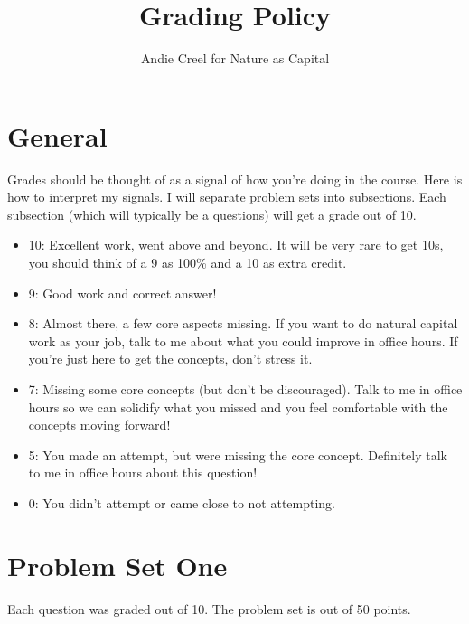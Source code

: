 \documentclass{article}
\title{Grading Policy}
\author{Andie Creel for Nature as Capital}
\begin{document}
\maketitle

\section{General}
Grades should be thought of as a signal of how you're doing in the course. Here is how to interpret my signals. I will separate problem sets into subsections. Each subsection (which will typically be a questions) will get a grade out of 10. 
\begin{itemize}
    \item 10: Excellent work, went above and beyond. It will be very rare to get 10s, you should think of a 9 as 100\% and a 10 as extra credit.
    \item 9: Good work and correct answer!
    \item 8: Almost there, a few core aspects missing. If you want to do natural capital work as your job, talk to me about what you could improve in office hours. If you're just here to get the concepts, don't stress it.
    \item 7: Missing some core concepts (but don't be discouraged). Talk to me in office hours so we can solidify what you missed and you feel comfortable with the concepts moving forward! 
    \item 5: You made an attempt, but were missing the core concept. Definitely talk to me in office hours about this question! 
    \item 0: You didn't attempt or came close to not attempting. 
    
\end{itemize}

\section{Problem Set One}
Each question was graded out of 10. The problem set is out of 50 points. 



\end{document}
